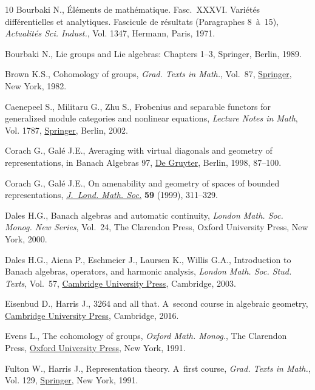 \documentclass[pdftex]{sigma}
\numberwithin{equation}{section}
\begin{document}
\begin{thebibliography}{10}
Bourbaki N., \'El\'ements de math\'ematique. {F}asc.~{XXXVI}. {V}ari\'et\'es
 diff\'erentielles et analytiques. {F}ascicule de r\'esultats ({P}aragraphes
 8~\`a~15), \textit{Actualit\'es Sci. Indust.}, Vol. 1347, Hermann, Paris,
 1971.

Bourbaki N., Lie groups and {L}ie algebras: {C}hapters 1--3, Springer, Berlin,
 1989.

Brown K.S., Cohomology of groups, \textit{Grad. Texts in Math.}, Vol.~87,
 \href{https://doi.org/10.1007/978-1-4684-9327-6}{Springer}, New York, 1982.

Caenepeel S., Militaru G., Zhu S., Frobenius and separable functors for
 generalized module categories and nonlinear equations, \textit{Lecture Notes
 in Math}, Vol. 1787, \href{https://doi.org/10.1007/b83849}{Springer}, Berlin, 2002.

Corach G., Gal\'e J.E., Averaging with virtual diagonals and geometry of
 representations, in Banach {A}lgebras 97, \href{https://doi.org/10.1515/9783110802009.87}{De Gruyter}, Berlin, 1998, 87--100.

Corach G., Gal\'e J.E., On amenability and geometry of spaces of bounded
 representations, \href{https://doi.org/10.1112/S0024610798006759}{\textit{J.~Lond. Math. Soc.}} \textbf{59} (1999), 311--329.

Dales H.G., Banach algebras and automatic continuity, \textit{London Math. Soc.
 Monog. New Series}, Vol.~24, The Clarendon Press, Oxford University Press,
 New York, 2000.

Dales H.G., Aiena P., Eschmeier J., Laursen K., Willis G.A., Introduction to
 {B}anach algebras, operators, and harmonic analysis, \textit{London Math.
 Soc. Stud. Texts}, Vol.~57, \href{https://doi.org/10.1017/CBO9780511615429}{Cambridge University Press}, Cambridge, 2003.

Eisenbud D., Harris J., 3264 and all that. {A}~second course in algebraic
 geometry, \href{https://doi.org/10.1017/CBO9781139062046}{Cambridge University Press}, Cambridge, 2016.

Evens L., The cohomology of groups, \textit{Oxford Math. Monog.}, The Clarendon Press,
 \href{https://doi.org/10.1093/oso/9780198535805.001.0001}{Oxford University Press}, New York, 1991.

Fulton W., Harris J., Representation theory. {A}~first course, \textit{Grad.
 Texts in Math.}, Vol. 129, \href{https://doi.org/10.1007/978-1-4612-0979-9}{Springer}, New York, 1991.


\end{thebibliography}
\end{document}
